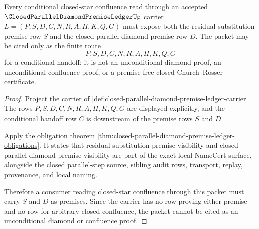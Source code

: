 \begin{theorem}
\label{thm:closed-parallel-diamond-premise-conditional-boundary}
Every conditional closed-star confluence read through an accepted $\ClosedParallelDiamondPremiseLedgerUp$ carrier $L=(P,S,D,C,N,R,A,H,K,Q,G)$ must expose both the residual-substitution premise row $S$ and the closed parallel diamond premise row $D$. The packet may be cited only as the finite route
$$
P,S,D,C,N,R,A,H,K,Q,G
$$
for a conditional handoff; it is not an unconditional diamond proof, an unconditional confluence proof, or a premise-free closed Church--Rosser certificate.
\end{theorem}
\begin{proof}
Project the carrier of \autoref{def:closed-parallel-diamond-premise-ledger-carrier}. The rows $P,S,D,C,N,R,A,H,K,Q,G$ are displayed explicitly, and the conditional handoff row $C$ is downstream of the premise rows $S$ and $D$.

Apply the obligation theorem \autoref{thm:closed-parallel-diamond-premise-ledger-obligations}. It states that residual-substitution premise visibility and closed parallel diamond premise visibility are part of the exact local NameCert surface, alongside the closed parallel-step source, sibling audit rows, transport, replay, provenance, and local naming.

Therefore a consumer reading closed-star confluence through this packet must carry $S$ and $D$ as premises. Since the carrier has no row proving either premise and no row for arbitrary closed confluence, the packet cannot be cited as an unconditional diamond or confluence proof.
\end{proof}

